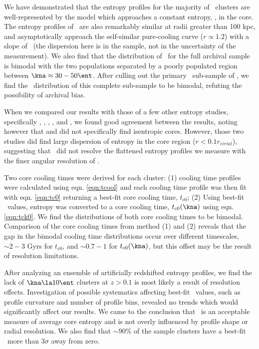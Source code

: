 \documentclass{emulateapj}
\begin{document}
We have demonstrated that the entropy profiles for the majority of
\accept\ clusters are well-represented by the model which approaches a
constant entropy, \kna, in the core. The entropy profiles of
\accept\ are also remarkably similar at radii greater than 100 kpc,
and asymptotically approach the self-similar pure-cooling curve ($r
\propto 1.2$) with a slope of \alphafs\ (the dispersion here is in the
sample, not in the uncertainty of the measurement). We also find that
the distribution of \kna\ for the full archival sample is bimodal with
the two populations separated by a poorly populated region between
$\kna \approx 30-50 \ent$. After culling out the primary
\hifl\ sub-sample of \citet{hiflugcs1}, we find the \kna\ distribution
of this complete sub-sample to be bimodal, refuting the possibility of
archival bias.

When we compared our results with those of a few other entropy
studies, specifically \citet{davies00}, \citet{ponman03},
\citet{piffaretti05}, \citet{pratt06}, and \citet{morandi07}, we found
good agreement between the results, noting however that
\citet{piffaretti05} and \citet{pratt06} did not specifically find
isentropic cores. However, those two studies did find large dispersion
of entropy in the core region ($r < 0.1 r_{virial}$), suggesting that
\xmm\ did not resolve the flattened entropy profiles we measure with
the finer angular resolution of \chandra.

Two core cooling times were derived for each cluster: (1) cooling time
profiles were calculated using eqn. \ref{eqn:tcool} and each cooling
time profile was then fit with eqn. \ref{eqn:tc0} returning a best-fit
core cooling time, $t_{c0}$; (2) Using best-fit \kna\ values, entropy
was converted to a core cooling time, $t_{c0}(\kna)$ using
eqn. \ref{eqn:tck0}. We find the distributions of both core cooling
times to be bimodal. Comparison of the core cooling times from method
(1) and (2) reveals that the gap in the bimodal cooling time
distributions occur over different timescales, $\sim 2-3$ Gyrs for
$t_{c0}$, and $\sim 0.7-1$ for $t_{c0}(\kna)$, but this offset may be
the result of resolution limitations.

After analyzing an ensemble of artificially redshifted entropy
profiles, we find the lack of $\kna \la 10 \ent$ clusters at $z > 0.1$
is most likely a result of resolution effects. Investigation of
possible systematics affecting best-fit \kna\ values, such as profile
curvature and number of profile bins, revealed no trends which would
significantly affect our results. We came to the conclusion that
\kna\ is an acceptable measure of average core entropy and is not
overly influenced by profile shape or radial resolution. We also find
that $\sim90\%$ of the sample clusters have a best-fit \kna\ more than
$3\sigma$ away from zero.
\end{document}
